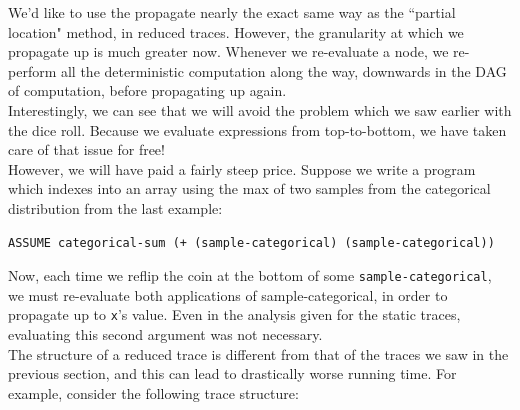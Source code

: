 \documentclass[10pt]{article}
\begin{document}
We'd like to use the propagate nearly the exact same way as the ``partial location" method, in reduced traces.   However, the granularity at which we propagate up is much greater now.  Whenever we re-evaluate a node, we re-perform all the deterministic computation along the way, downwards in the DAG of computation, before propagating up again.  \\

Interestingly, we can see that we will avoid the problem which we saw earlier with the dice roll.  Because we evaluate expressions from top-to-bottom, we have taken care of that issue for free!\\

However, we will have paid a fairly steep price.  Suppose we write a program which indexes into an array using the max of two samples from the categorical distribution from the last example:

\begin{leftbar} \begin{small} \begin{verbatim}
ASSUME categorical-sum (+ (sample-categorical) (sample-categorical)) 
\end{verbatim} \end{small} \end{leftbar}

Now, each time we reflip the coin at the bottom of some {\tt sample-categorical}, we must re-evaluate both applications of sample-categorical, in order to propagate up to {\tt x}'s value.  Even in the analysis given for the static traces, evaluating this second argument was not necessary.  \\

The structure of a reduced trace is different from that of the traces we saw in the previous section, and this can lead to drastically worse running time.  For example, consider the following trace structure:\\

\begin{center}
\end{center}
\end{document}
